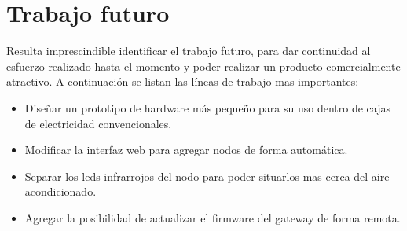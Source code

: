 \section{Trabajo futuro }

Resulta imprescindible identificar el trabajo futuro, para dar continuidad al esfuerzo realizado hasta el momento y poder realizar un producto comercialmente atractivo. A continuación se listan las líneas de trabajo mas importantes:

\begin{itemize}
\item Diseñar un prototipo de hardware más pequeño para su uso dentro de cajas de electricidad convencionales.
\item Modificar la interfaz web para agregar nodos de forma automática.
\item Separar los leds infrarrojos del nodo para poder situarlos mas cerca del aire acondicionado.
\item Agregar la posibilidad de actualizar el firmware del gateway de forma remota.
\end{itemize}



